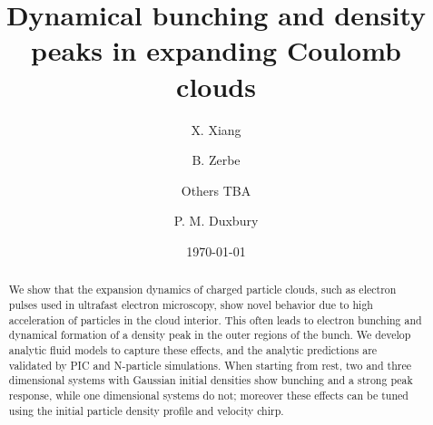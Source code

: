 \documentclass[aps,prl,twocolumn,showpacs,superscriptaddress,groupedaddress]{revtex4-1}  %
\begin{document}
\title{Dynamical bunching and density peaks in expanding Coulomb clouds}
\author{X. Xiang}\email{}
\author{B. Zerbe}
\author{Others TBA}
\author{P. M. Duxbury}


\date{\today}

\newcommand{\vect}[1]{\boldsymbol{#1}}​


\begin{abstract}
We show that the expansion dynamics of charged particle clouds, such as electron pulses used 
in ultrafast electron microscopy, show novel behavior due to high acceleration of 
particles in the cloud interior.    This often leads to electron bunching and dynamical  formation of a density peak 
in the outer regions of the bunch.     We develop analytic fluid models 
to capture these effects, and the analytic predictions are validated by PIC and N-particle simulations.   
When starting from rest, two and three dimensional 
systems with Gaussian initial densities show bunching and a strong peak response, 
while one dimensional systems do not; moreover these effects can be 
tuned using the initial particle density profile and velocity chirp.  

\end{abstract}

\maketitle
\end{document}
